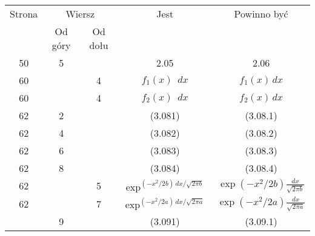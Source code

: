 \documentclass[a4paper,11pt]{article}
\numberwithin{equation}{section}
\begin{document}
\begin{center}

  \begin{tabular}{|c|c|c|c|c|}
    \hline
    Strona & \multicolumn{2}{c|}{Wiersz} & Jest
    & Powinno być \\ \cline{2-3}
    & Od góry & Od dołu & & \\
    \hline
    50 & \hphantom{0}5 & & 2.05 & 2.06 \\
    60 & & \hphantom{0}4 & $f_{ 1 }( x ) \;\: dx$ & $f_{ 1 }( x ) \, dx$ \\
    60 & & \hphantom{0}4 & $f_{ 2 }( x ) \;\: dx$ & $f_{ 2 }( x ) \, dx$ \\
    62 & \hphantom{0}2 & & (3.081) & (3.08.1) \\
    62 & \hphantom{0}4 & & (3.082) & (3.08.2) \\
    62 & \hphantom{0}6 & & (3.083) & (3.08.3) \\
    62 & \hphantom{0}8 & & (3.084) & (3.08.4) \\
    62 & & \hphantom{0}5
    & $\exp^{ ( -x^{ 2 } / 2b ) \, dx / \sqrt{ 2 \pi b } }$
    & $\exp( -x^{ 2 } / 2b ) \frac{ dx }{ \sqrt{ 2 \pi b } }$ \\
    62 & & \hphantom{0}7
    & $\exp^{ ( -x^{ 2 } / 2a ) \, dx / \sqrt{ 2 \pi a } }$
    & $\exp( -x^{ 2 } / 2a ) \frac{ dx }{ \sqrt{ 2 \pi a } }$ \\
    & \hphantom{0}9 & & (3.091) & (3.09.1) \\
    \hline
  \end{tabular}

\end{center}

\VerSpaceTwo













\printbibliography





\end{document}
